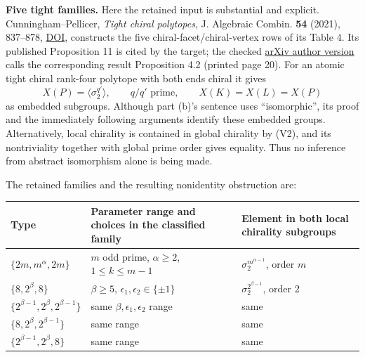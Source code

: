 \documentclass[
  10pt,
  letterpaper,
]{article}
\newcounter{none} %
\begin{document}
\textbf{Five tight families.} Here the retained input is substantial and
explicit. Cunningham--Pellicer, \emph{Tight chiral polytopes}, J.
Algebraic Combin. \textbf{54} (2021), 837--878,
\href{https://doi.org/10.1007/s10801-021-01023-z}{DOI}, constructs the
five chiral-facet/chiral-vertex rows of its Table 4. Its published
Proposition 11 is cited by the target; the checked
\href{https://arxiv.org/pdf/2009.04566}{arXiv author version} calls the
corresponding result Proposition 4.2 (printed page 20). For an atomic
tight chiral rank-four polytope with both ends chiral it gives \[
 X(P)=\langle\sigma_2^{q'}\rangle,\qquad q/q'\text{ prime},
 \qquad X(K)=X(L)=X(P)
\] as embedded subgroups. Although part (b)'s sentence uses
``isomorphic'', its proof and the immediately following arguments
identify these embedded groups. Alternatively, local chirality is
contained in global chirality by (V2), and its nontriviality together
with global prime order gives equality. Thus no inference from abstract
isomorphism alone is being made.

The retained families and the resulting nonidentity obstruction are:

{\def\LTcaptype{none} %
\begin{longtable}[]{@{}
  >{\raggedright\arraybackslash}p{}
  >{\raggedright\arraybackslash}p{}
  >{\raggedright\arraybackslash}p{}@{}}
\toprule\noalign{}
\begin{minipage}[b]{\linewidth}\raggedright
Type
\end{minipage} & \begin{minipage}[b]{\linewidth}\raggedright
Parameter range and choices in the classified family
\end{minipage} & \begin{minipage}[b]{\linewidth}\raggedright
Element in both local chirality subgroups
\end{minipage} \\
\midrule\noalign{}
\endhead
\bottomrule\noalign{}
\endlastfoot
\(\{2m,m^\alpha,2m\}\) & \(m\) odd prime, \(\alpha\ge2\),
\(1\le k\le m-1\) & \(\sigma_2^{m^{\alpha-1}}\), order \(m\) \\
\(\{8,2^\beta,8\}\) & \(\beta\ge5\),
\(\epsilon_1,\epsilon_2\in\{\pm1\}\) & \(\sigma_2^{2^{\beta-1}}\), order
2 \\
\(\{2^{\beta-1},2^\beta,2^{\beta-1}\}\) & same
\(\beta,\epsilon_1,\epsilon_2\) range & same \\
\(\{8,2^\beta,2^{\beta-1}\}\) & same range & same \\
\(\{2^{\beta-1},2^\beta,8\}\) & same range & same \\
\end{longtable}
}
\end{document}
